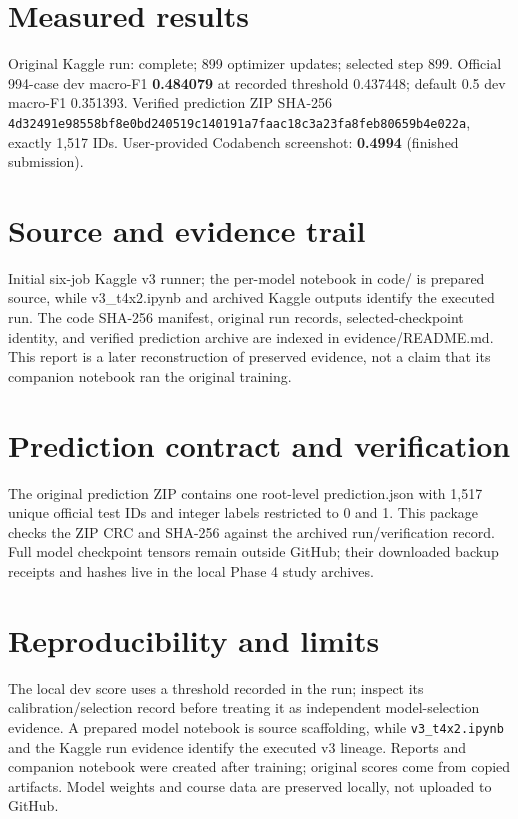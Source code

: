 \documentclass[11pt,a4paper]{article}
\begin{document}
\section{Measured results}
Original Kaggle run: complete; 899 optimizer updates; selected step 899. Official 994-case dev macro-F1 \textbf{0.484079} at recorded threshold 0.437448; default 0.5 dev macro-F1 0.351393. Verified prediction ZIP SHA-256 \texttt{4d32491e98558bf8e0bd240519c140191a7faac18c3a23fa8feb80659b4e022a}, exactly 1,517 IDs. User-provided Codabench screenshot: \textbf{0.4994} (finished submission).
\section{Source and evidence trail}
Initial six-job Kaggle v3 runner; the per-model notebook in code/ is prepared source, while v3\_t4x2.ipynb and archived Kaggle outputs identify the executed run. The code SHA-256 manifest, original run records, selected-checkpoint identity, and verified prediction archive are indexed in evidence/README.md. This report is a later reconstruction of preserved evidence, not a claim that its companion notebook ran the original training.
\section{Prediction contract and verification}
The original prediction ZIP contains one root-level prediction.json with 1,517 unique official test IDs and integer labels restricted to 0 and 1. This package checks the ZIP CRC and SHA-256 against the archived run/verification record. Full model checkpoint tensors remain outside GitHub; their downloaded backup receipts and hashes live in the local Phase 4 study archives.
\section{Reproducibility and limits}
The local dev score uses a threshold recorded in the run; inspect its calibration/selection record before treating it as independent model-selection evidence. A prepared model notebook is source scaffolding, while \texttt{v3\_t4x2.ipynb} and the Kaggle run evidence identify the executed v3 lineage. Reports and companion notebook were created after training; original scores come from copied artifacts. Model weights and course data are preserved locally, not uploaded to GitHub.
\end{document}
